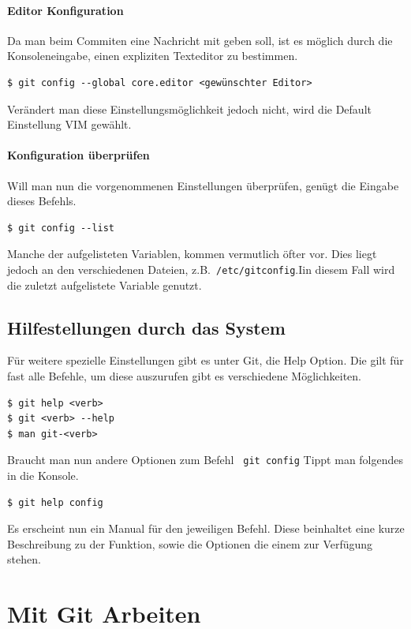 \documentclass[12pt,a4paper,bibliography=totocnumbered,listof=totocnumbered]{scrartcl}
\begin{document}
\paragraph{Editor Konfiguration}
Da man beim Commiten eine Nachricht mit geben soll,  ist es möglich durch die Konsoleneingabe,  einen expliziten Texteditor zu bestimmen.
\begin{lstlisting}
$ git config --global core.editor <gewünschter Editor>
 \end{lstlisting}
Verändert man diese Einstellungsmöglichkeit jedoch nicht, wird die Default Einstellung VIM gewählt.

\paragraph{Konfiguration überprüfen}
Will man nun die vorgenommenen Einstellungen überprüfen, genügt die Eingabe dieses Befehls.
\begin{lstlisting}
$ git config --list
\end{lstlisting}

Manche der aufgelisteten Variablen, kommen vermutlich öfter vor. Dies liegt jedoch an den verschiedenen Dateien, z.B.\lstinline| /etc/gitconfig|.Iin diesem Fall wird die zuletzt aufgelistete Variable genutzt.
\newpage
\subsection{Hilfestellungen durch das System}
Für weitere spezielle Einstellungen gibt es unter Git, die Help Option.
Die gilt für fast alle Befehle, um diese auszurufen gibt es verschiedene Möglichkeiten.
\begin{lstlisting}
$ git help <verb>
$ git <verb> --help
$ man git-<verb>
\end{lstlisting} 

Braucht man nun andere Optionen zum Befehl \lstinline| git config| Tippt man folgendes in die Konsole. 
\begin{lstlisting}
$ git help config
\end{lstlisting}
Es erscheint nun ein Manual für den jeweiligen Befehl. Diese beinhaltet eine kurze Beschreibung zu der Funktion, sowie die Optionen die einem zur Verfügung stehen.  
  






\section{Mit Git Arbeiten }
\end{document}
